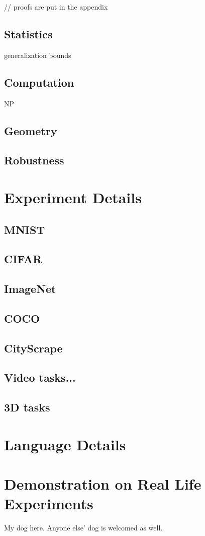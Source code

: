 \documentclass[10pt, oneside]{article}   	%
\theoremstyle{definition}
\begin{document}
// proofs are put in the appendix
\subsection{Statistics}
generalization bounds
\subsection{Computation}

NP
\subsection{Geometry}

\subsection{Robustness}


\clearpage
{}
\section{Experiment Details}
\subsection{MNIST}
\subsection{CIFAR}
\subsection{ImageNet}
\subsection{COCO}
\subsection{CityScrape}
\subsection{Video tasks...}
\subsection{3D tasks}
\section{Language Details}
\section{Demonstration on Real Life Experiments}

My dog here. Anyone else' dog is welcomed as well.
\end{document}
